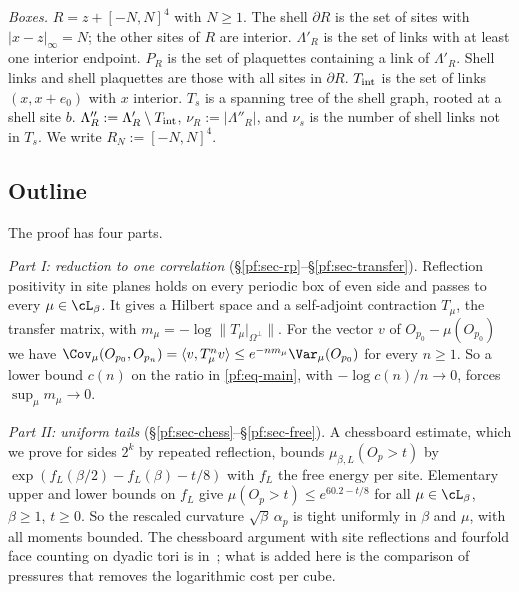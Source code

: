 \emph{Boxes.} $R=z+[-N,N]^4$ with $N\ge1$. The shell $\partial R$ is the set of sites with $|x-z|_\infty=N$; the other sites of $R$ are interior. $\Lambda'_R$ is the set of links with at least one interior endpoint. $P_R$ is the set of plaquettes containing a link of $\Lambda'_R$. Shell links and shell plaquettes are those with all sites in $\partial R$. $T_{\rm int}$ is the set of links $(x,x+e_0)$ with $x$ interior. $T_s$ is a spanning tree of the shell graph, rooted at a shell site $b$. $\Lambda''_R:=\Lambda'_R\setminus T_{\rm int}$, $\nu_R:=|\Lambda''_R|$, and $\nu_s$ is the number of shell links not in $T_s$. We write $R_N:=[-N,N]^4$.

\subsection{Outline}\label{pf:sec-outline}

The proof has four parts.

\emph{Part I: reduction to one correlation} (\S\ref{pf:sec-rp}--\S\ref{pf:sec-transfer}). Reflection positivity in site planes holds on every periodic box of even side and passes to every $\mu\in\cL_\beta$. It gives a Hilbert space and a self-adjoint contraction $T_\mu$, the transfer matrix, with $m_\mu=-\log\|T_\mu|_{\Omega^\perp}\|$. For the vector $v$ of $O_{p_0}-\mu(O_{p_0})$ we have $\Cov_\mu(O_{p_0},O_{p_n})=\langle v,T_\mu^nv\rangle\le e^{-nm_\mu}\Var_\mu(O_{p_0})$ for every $n\ge1$. So a lower bound $c(n)$ on the ratio in \eqref{pf:eq-main}, with $-\log c(n)/n\to0$, forces $\sup_\mu m_\mu\to0$.

\emph{Part II: uniform tails} (\S\ref{pf:sec-chess}--\S\ref{pf:sec-free}). A chessboard estimate, which we prove for sides $2^k$ by repeated reflection, bounds $\mu_{\beta,L}(O_p>t)$ by $\exp(f_L(\beta/2)-f_L(\beta)-t/8)$ with $f_L$ the free energy per site. Elementary upper and lower bounds on $f_L$ give $\mu(O_p>t)\le e^{60.2-t/8}$ for all $\mu\in\cL_\beta$, $\beta\ge1$, $t\ge0$. So the rescaled curvature $\sqrt\beta\,\alpha_p$ is tight uniformly in $\beta$ and $\mu$, with all moments bounded. The chessboard argument with site reflections and fourfold face counting on dyadic tori is in~\cite[Lemma~139, Theorem~140]{BhattEtAl26}; what is added here is the comparison of pressures that removes the logarithmic cost per cube.

